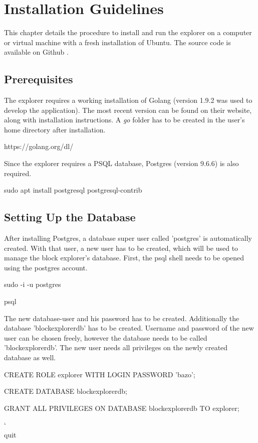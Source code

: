 \appendix

\chapter{Installation Guidelines}
This chapter details the procedure to install and run the explorer on a computer or virtual machine with a fresh installation of Ubuntu. The source code is available on Github \cite{explorer}.

\section{Prerequisites}
The explorer requires a working installation of Golang (version 1.9.2 was used to develop the application). The most recent version can be found on their website, along with installation instructions. A \emph{go} folder has to be created in the user's home directory after installation.

\begin{framed}
https://golang.org/dl/
\end{framed}

Since the explorer requires a PSQL database, Postgres (version 9.6.6) is also required.

\begin{framed}
sudo apt install postgresql postgresql-contrib
\end{framed}

\section{Setting Up the Database}

After installing Postgres, a database super user called 'postgres' is automatically created. With that user, a new user has to be created, which will be used to manage the block explorer's database. First, the psql shell needs to be opened using the postgres account.

\begin{framed}
sudo -i -u postgres

psql
\end{framed}
The new database-user and his password has to be created. Additionally the database 'blockexplorerdb' has to be created. Username and password of the new user can be chosen freely, however the database needs to be called 'blockexplorerdb'. The new user needs all privileges on the newly created database as well.

\begin{framed}
CREATE ROLE explorer WITH LOGIN PASSWORD 'bazo';

CREATE DATABASE blockexplorerdb;

GRANT ALL PRIVILEGES ON DATABASE blockexplorerdb TO explorer;

\char`\\quit
\end{framed}

